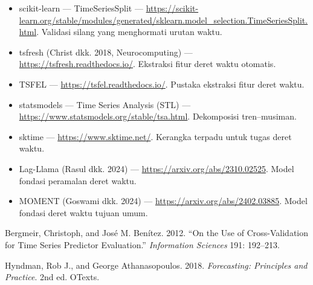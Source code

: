 \begin{bacaan}

\begin{itemize}
\tightlist
\item
  scikit-learn --- TimeSeriesSplit --- \url{https://scikit-learn.org/stable/modules/generated/sklearn.model_selection.TimeSeriesSplit.html}. Validasi silang yang menghormati urutan waktu.
\item
  tsfresh (Christ dkk. 2018, Neurocomputing) --- \url{https://tsfresh.readthedocs.io/}. Ekstraksi fitur deret waktu otomatis.
\item
  TSFEL --- \url{https://tsfel.readthedocs.io/}. Pustaka ekstraksi fitur deret waktu.
\item
  statsmodels --- Time Series Analysis (STL) --- \url{https://www.statsmodels.org/stable/tsa.html}. Dekomposisi tren--musiman.
\item
  sktime --- \url{https://www.sktime.net/}. Kerangka terpadu untuk tugas deret waktu.
\item
  Lag-Llama (Rasul dkk. 2024) --- \url{https://arxiv.org/abs/2310.02525}. Model fondasi peramalan deret waktu.
\item
  MOMENT (Goswami dkk. 2024) --- \url{https://arxiv.org/abs/2402.03885}. Model fondasi deret waktu tujuan umum.
\end{itemize}

\end{bacaan}

\rujukanheading

\protect{}\label{refs}
\begin{CSLReferences}{1}{1}
Bergmeir, Christoph, and José M. Benítez. 2012. {``On the Use of Cross-Validation for Time Series Predictor Evaluation.''} \emph{Information Sciences} 191: 192--213.

Hyndman, Rob J., and George Athanasopoulos. 2018. \emph{Forecasting: Principles and Practice}. 2nd ed. OTexts.

\end{CSLReferences}

